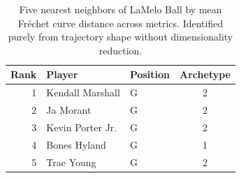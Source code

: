 \begin{table}[htbp]
  \centering\small
  \begin{tabular}{rllc}
    \toprule
    Rank & Player & Position & Archetype \\
    \midrule
    1 & Kendall Marshall & G & 2 \\
    2 & Ja Morant & G & 2 \\
    3 & Kevin Porter Jr. & G & 2 \\
    4 & Bones Hyland & G & 1 \\
    5 & Trae Young & G & 2 \\
    \bottomrule
  \end{tabular}
  \caption{Five nearest neighbors of LaMelo Ball by mean Fr\'{e}chet curve distance across metrics. Identified purely from trajectory shape without dimensionality reduction.}
  \label{tab:LaMelo_Ball_frechet_curve_neighbors}
\end{table}

